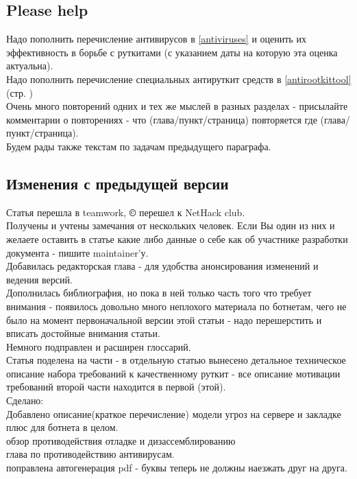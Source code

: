 \subsection{Please help}

Надо пополнить перечисление антивирусов в \ref{antiviruses} и оценить их эффективность в борьбе с руткитами (с указанием даты на которую эта оценка актуальна).\\
Надо пополнить перечисление специальных антируткит средств в \ref{antirootkittool} (стр. \pageref{antirootkittool})\\
Очень много повторений одних и тех же мыслей в разных разделах - присылайте комментарии о повторениях - что (глава/пункт/страница) повторяется где (глава/пункт/страница).\\
Будем рады также текстам по задачам предыдущего параграфа.\\

\subsection{Изменения с предыдущей версии}

Статья перешла в teamwork, {\bf \copyright } перешел к NetHack club.\\

Получены и учтены замечания от нескольких человек. Если Вы один из них и желаете
оставить в статье какие либо данные о себе как об участнике разработки документа - пишите
maintainer'у.\\

Добавилась редакторская глава - для удобства анонсирования изменений и ведения версий.\\

Дополнилась библиография, но пока в ней только часть того что требует внимания - появилось довольно
много неплохого материала по ботнетам, чего не было на момент первоначальной версии этой статьи - надо
перешерстить и вписать достойные внимания статьи. \\

Немного подправлен и расширен глоссарий.\\

Статья поделена на части - в отдельную статью вынесено детальное техническое описание набора требований к
 качественному руткит - все описание мотивации требований второй части находится в первой (этой).\\

Сделано:\\
Добавлено описание(краткое перечисление) модели угроз на сервере и закладке плюс для ботнета в целом.\\
обзор противодействия отладке и дизассемблированию\\
глава по противодействию антивирусам.\\
поправлена автогенерация pdf - буквы теперь не должны наезжать друг на друга.\\

